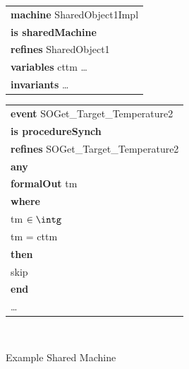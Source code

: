 \begin{figure}
\begin{sffamily}
\begin{minipage}{0.5\linewidth}
\begin{tabular}{l}
\textbf{machine} SharedObject1Impl\\
\textbf{is sharedMachine} \\
\textbf{refines} SharedObject1 \\
\textbf{variables} cttm \ldots \\
\textbf{invariants} \ldots \\
\end{tabular}
\end{minipage}
\begin{minipage}{0.5\linewidth}
\begin{tabular}{l}
\quad\textbf{event} SOGet\_Target\_Temperature2\\
\quad\textbf{is procedureSynch}\\
\quad \textbf{refines} SOGet\_Target\_Temperature2\\
\quad\textbf{any}\\
\qquad \textbf{formalOut} tm \\
\quad\textbf{where}\\
\qquad tm $\in \intg$\\
\qquad tm = cttm\\
\quad\textbf{then}\\
\qquad skip\\
\quad \textbf{end}\\
\qquad  \ldots
\end{tabular}
\end{minipage}
\end{sffamily}
	\caption{Example Shared Machine}
	\label{fig:SharedMachine}
\
\end{figure}
%
